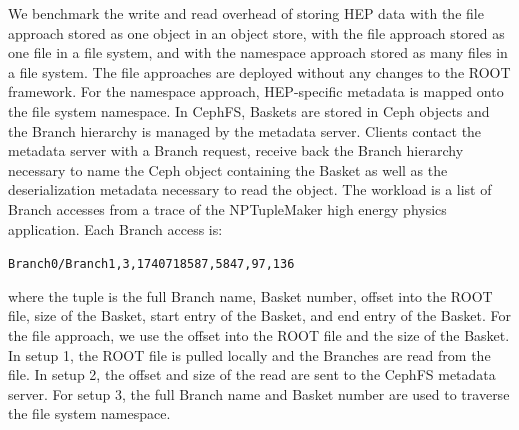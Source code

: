 
We benchmark the write and read overhead of storing HEP data with the file
approach stored as one object in an object store, with the file approach stored
as one file in a file system, and with the namespace approach stored as many
files in a file system.  The file approaches are deployed without any changes
to the ROOT framework. For the namespace approach, HEP-specific metadata is
mapped onto the file system namespace. In CephFS, Baskets are stored in Ceph
objects and the Branch hierarchy is managed by the metadata server.  Clients
contact the metadata server with a Branch request, receive back the Branch
hierarchy necessary to name the Ceph object containing the Basket as well as
the deserialization metadata necessary to read the object.  The workload is a
list of Branch accesses from a trace of the NPTupleMaker high energy physics
application. Each Branch access is:

\texttt{Branch0/Branch1,3,1740718587,5847,97,136}

where the tuple is the full Branch name, Basket number, offset into the ROOT
file, size of the Basket, start entry of the Basket, and end entry of the
Basket.  For the file approach, we use the offset into the ROOT file and the
size of the Basket.  In setup 1, the ROOT file is pulled locally and the
Branches are read from the file. In setup 2, the offset and size of the read
are sent to the CephFS metadata server.  For setup 3, the full Branch name and
Basket number are used to traverse the file system namespace.


